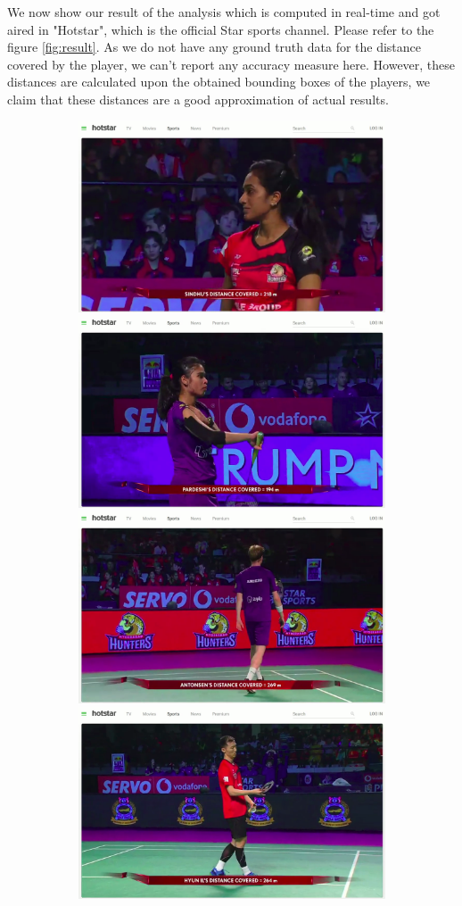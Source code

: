 \documentclass[runningheads,a4paper]{llncs}
\begin{document}
We now show our result of the analysis which is computed in real-time and got aired in "Hotstar", which is the official Star sports channel. Please refer to the figure \ref{fig:result}. As we do not have any ground truth data for the distance covered by the player, we can't report any accuracy measure here. However, these distances are calculated upon the obtained bounding boxes of the players, we claim that these distances are a good approximation of actual results.
\iftrue
\begin{figure}
    \centering
    \begin{subfigure}{\linewidth}
        \includegraphics[width=.5\linewidth]{Images/result1.png}\hfill
        \includegraphics[width=.5\linewidth]{Images/result2.png}\hfill
        \includegraphics[width=.5\linewidth]{Images/result3.png}\hfill
        \includegraphics[width=.5\linewidth]{Images/result4.png}\hfill

\end{subfigure}
\end{figure}
\end{document}
